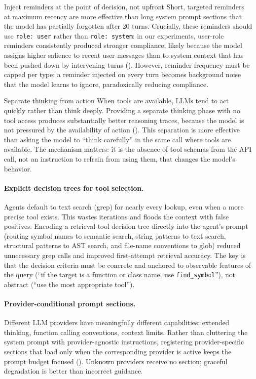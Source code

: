 \begin{lessonbox}{Inject reminders at the point of decision, not upfront}
Short, targeted reminders at maximum recency are more effective than long system prompt sections that the model has partially forgotten after 20 turns. Crucially, these reminders should use \texttt{role:~user} rather than \texttt{role:~system}: in our experiments, user-role reminders consistently produced stronger compliance, likely because the model assigns higher salience to recent user messages than to system context that has been pushed down by intervening turns (). However, reminder frequency must be capped per type; a reminder injected on every turn becomes background noise that the model learns to ignore, paradoxically reducing compliance.
\end{lessonbox}

\begin{lessonbox}{Separate thinking from action}
When tools are available, LLMs tend to act quickly rather than think deeply. Providing a separate thinking phase with no tool access produces substantially better reasoning traces, because the model is not pressured by the availability of action (). This separation is more effective than asking the model to ``think carefully'' in the same call where tools are available. The mechanism matters: it is the absence of tool schemas from the API call, not an instruction to refrain from using them, that changes the model's behavior.
\end{lessonbox}

\paragraph{Explicit decision trees for tool selection.} Agents default to text search (grep) for nearly every lookup, even when a more precise tool exists. This wastes iterations and floods the context with false positives. Encoding a retrieval-tool decision tree directly into the agent's prompt (routing symbol names to semantic search, string patterns to text search, structural patterns to AST search, and file-name conventions to glob) reduced unnecessary grep calls and improved first-attempt retrieval accuracy. The key is that the decision criteria must be concrete and anchored to observable features of the query (``if the target is a function or class name, use \texttt{find\_symbol}''), not abstract (``use the most appropriate tool'').

\paragraph{Provider-conditional prompt sections.} Different LLM providers have meaningfully different capabilities: extended thinking, function calling conventions, context limits. Rather than cluttering the system prompt with provider-agnostic instructions, registering provider-specific sections that load only when the corresponding provider is active keeps the prompt budget focused (). Unknown providers receive no section; graceful degradation is better than incorrect guidance.

